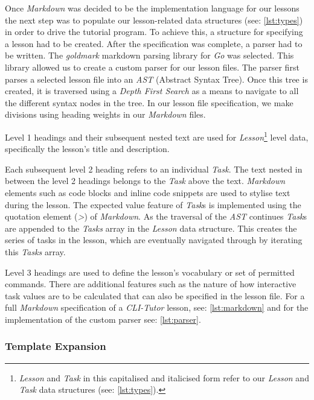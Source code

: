 Once \textit{Markdown} was decided to be the implementation language for our
lessons the next step was to populate our lesson-related data structures (see:
\autoref{lst:types}) in order to drive the tutorial program. To achieve this, a
structure for specifying a lesson had to be created. After the specification
was complete, a parser had to be written. The \textit{goldmark} markdown parsing
library for \textit{Go} was selected. This library allowed us to create a
custom parser for our lesson files. The parser first parses a selected lesson
file into an \textit{AST} (Abstract Syntax Tree). Once this tree is created, it
is traversed using a \textit{Depth First Search} as a means to navigate to all
the different syntax nodes in the tree. In our lesson file specification, we
make divisions using heading weights in our \textit{Markdown} files. 

Level 1 headings and their subsequent nested text are used for
\textit{Lesson}\footnote{\textit{Lesson} and \textit{Task} in this
capitalised and italicised form refer to our \textit{Lesson} and \textit{Task}
data structures (see: \autoref{lst:types}).} level data, specifically the
lesson's title and description. 

Each subsequent level 2 heading refers to an individual \textit{Task}. The text
nested in between the level 2 headings belongs to the \textit{Task} above the text.
\textit{Markdown} elements such as code blocks and inline code snippets are
used to stylise text during the lesson. The expected value feature of
\textit{Task}s is implemented using the quotation element (\textit{>})
of \textit{Markdown}. As the traversal of the \textit{AST} continues
\textit{Task}s are appended to the \textit{Tasks} array in the \textit{Lesson}
data structure. This creates the series of tasks in the lesson, which are
eventually navigated through by iterating this \textit{Tasks} array. 

Level 3 headings are used to define the lesson's vocabulary or set of permitted
commands. There are additional features such as the nature of how interactive
task values are to be calculated that can also be specified in the lesson file.
For a full \textit{Markdown} specification of a \textit{CLI-Tutor} lesson, see:
\autoref{lst:markdown} and for the implementation of the custom parser see:
\autoref{lst:parser}. 

\subsubsection{Template Expansion}

